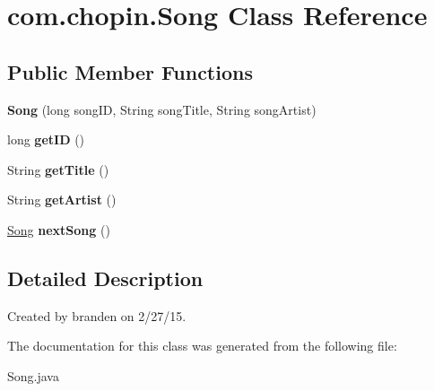 \hypertarget{classcom_1_1chopin_1_1Song}{}\section{com.\+chopin.\+Song Class Reference}
\label{classcom_1_1chopin_1_1Song}
\subsection*{Public Member Functions}
\begin{DoxyCompactItemize}
\item 
\hypertarget{classcom_1_1chopin_1_1Song_a5d23605b2530d06b9a3e51b4b429b081}{}{\bfseries Song} (long song\+I\+D, String song\+Title, String song\+Artist)\label{classcom_1_1chopin_1_1Song_a5d23605b2530d06b9a3e51b4b429b081}

\item 
\hypertarget{classcom_1_1chopin_1_1Song_aee53bad2ed0d8f2c8fa0f029e87eb261}{}long {\bfseries get\+I\+D} ()\label{classcom_1_1chopin_1_1Song_aee53bad2ed0d8f2c8fa0f029e87eb261}

\item 
\hypertarget{classcom_1_1chopin_1_1Song_a1a45e519b0bef1472fba21bd4642a165}{}String {\bfseries get\+Title} ()\label{classcom_1_1chopin_1_1Song_a1a45e519b0bef1472fba21bd4642a165}

\item 
\hypertarget{classcom_1_1chopin_1_1Song_acd2e913b6bda13bb83ec102b8367a348}{}String {\bfseries get\+Artist} ()\label{classcom_1_1chopin_1_1Song_acd2e913b6bda13bb83ec102b8367a348}

\item 
\hypertarget{classcom_1_1chopin_1_1Song_a8770d3de8fb394dc97dc8f89093765eb}{}\hyperlink{classcom_1_1chopin_1_1Song}{Song} {\bfseries next\+Song} ()\label{classcom_1_1chopin_1_1Song_a8770d3de8fb394dc97dc8f89093765eb}

\end{DoxyCompactItemize}


\subsection{Detailed Description}
Created by branden on 2/27/15. 

The documentation for this class was generated from the following file\+:\begin{DoxyCompactItemize}
\item 
Song.\+java\end{DoxyCompactItemize}
